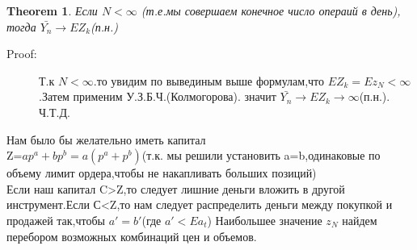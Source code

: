 \documentclass[12 pt, russian]{article}
\newtheorem{theorem}{Theorem}
\begin{document}
\begin{theorem}
 Если $N<\infty$ (т.е.мы совершаем конечное число операий в день), тогда $\bar{Y_n}\to EZ_k$(п.н.)
 \end{theorem}
\begin{description}
\item[Proof:] Т.к $N<\infty$.то увидим по вывединым выше формулам,что $EZ_k=Ez_N<\infty$.Затем применим У.З.Б.Ч.(Колмогорова). значит $\bar{Y_n}\to EZ_k\to\infty$(п.н.).\\
Ч.Т.Д.
\end{description}



Нам было бы желательно иметь капитал\\
 Z=$ap^a+bp^b=a(p^a+p^b)$(т.к. мы решили установить a=b,одинаковые по объему лимит ордера,чтобы не накапливать больших позиций)\\
 Если наш капитал C>Z,то следует лишние деньги вложить в другой инструмент.Если С<Z,то нам следует распределить деньги между покупкой и продажей так,чтобы $a'=b'$(где $a'<Ea_t$)
 Наибольшее значение $z_N$  найдем перебором возможных комбинаций цен и объемов.
\end{document}
